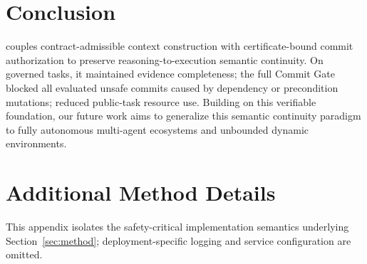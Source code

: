 \section{Conclusion}
\label{sec:conclusion}
\method{} couples contract-admissible context construction with certificate-bound commit authorization to preserve reasoning-to-execution semantic continuity.
On governed tasks, it maintained evidence completeness; the full Commit Gate blocked all evaluated unsafe commits caused by dependency or precondition mutations; \methodCRI{} reduced public-task resource use.
Building on this verifiable foundation, our future work aims to generalize this semantic continuity paradigm to fully autonomous multi-agent ecosystems and unbounded dynamic environments.
\balance


\clearpage
\onecolumn
\appendix
\newcommand{\PromptSynopsis}[2]{%
\begin{center}
\begin{minipage}{0.92\textwidth}
\hrule
\par\strut{\large\bfseries #1}\par
{\large\ttfamily\raggedright #2\par}
\par\strut\hrule
\end{minipage}
\end{center}}
\section{Additional Method Details}
\label{app:method-details}
This appendix isolates the safety-critical implementation semantics underlying Section~\ref{sec:method}; deployment-specific logging and service configuration are omitted.
